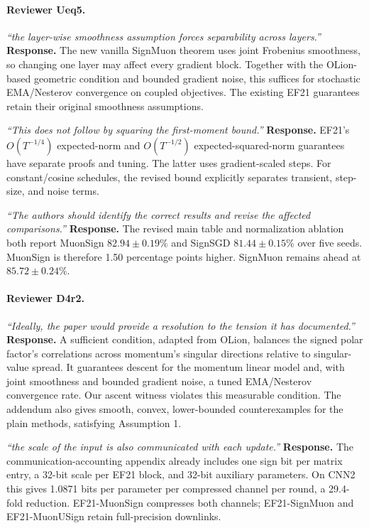 \paragraph{Reviewer Ueq5.}
\noindent\emph{``the layer-wise smoothness assumption forces separability across layers.''}
\textbf{Response.} The new vanilla SignMuon theorem uses joint Frobenius smoothness, so changing one layer may affect every gradient block. Together with the OLion-based geometric condition and bounded gradient noise, this suffices for stochastic EMA/Nesterov convergence on coupled objectives. The existing EF21 guarantees retain their original smoothness assumptions.

\noindent\emph{``This does not follow by squaring the first-moment bound.''}
\textbf{Response.} EF21's $O(T^{-1/4})$ expected-norm and $O(T^{-1/2})$ expected-squared-norm guarantees have separate proofs and tuning. The latter uses gradient-scaled steps. For constant/cosine schedules, the revised bound explicitly separates transient, step-size, and noise terms.

\noindent\emph{``The authors should identify the correct results and revise the affected comparisons.''}
\textbf{Response.} The revised main table and normalization ablation both report MuonSign $82.94\pm0.19\%$ and SignSGD $81.44\pm0.15\%$ over five seeds. MuonSign is therefore 1.50 percentage points higher. SignMuon remains ahead at $85.72\pm0.24\%$.

\paragraph{Reviewer D4r2.}
\noindent\emph{``Ideally, the paper would provide a resolution to the tension it has documented.''}
\textbf{Response.} A sufficient condition, adapted from OLion, balances the signed polar factor's correlations across momentum's singular directions relative to singular-value spread. It guarantees descent for the momentum linear model and, with joint smoothness and bounded gradient noise, a tuned EMA/Nesterov convergence rate. Our ascent witness violates this measurable condition. The addendum also gives smooth, convex, lower-bounded counterexamples for the plain methods, satisfying Assumption 1.

\noindent\emph{``the scale of the input is also communicated with each update.''}
\textbf{Response.} The communication-accounting appendix already includes one sign bit per matrix entry, a 32-bit scale per EF21 block, and 32-bit auxiliary parameters. On CNN2 this gives 1.0871 bits per parameter per compressed channel per round, a 29.4-fold reduction. EF21-MuonSign compresses both channels; EF21-SignMuon and EF21-MuonUSign retain full-precision downlinks.

